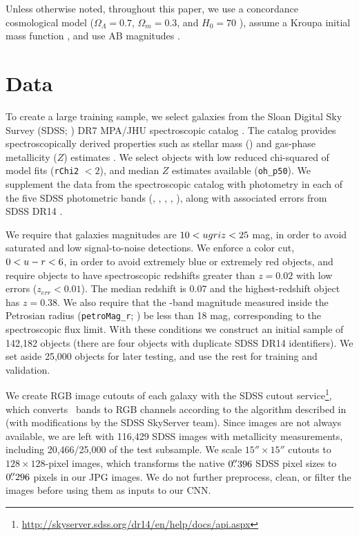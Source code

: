 \documentclass[fleqn,usenatbib]{mnras}
\begin{document}
Unless otherwise noted, throughout this paper, we use a concordance cosmological model ($\Omega_\Lambda = 0.7$, $\Omega_m = 0.3$, and $H_0= 70$ \kms{} \permpc), assume a Kroupa initial mass function \citep{Kroupa2001}, and use AB magnitudes \citep{Oke1974}.


\section{Data} \label{sec:data}
To create a large training sample, we select galaxies from the Sloan Digital Sky Survey (SDSS; \citealt{York2000}) DR7 MPA/JHU spectroscopic catalog \citep{Kauffmann2003a, Brinchmann2004, Tremonti2004, Salim2007}. The catalog provides spectroscopically derived properties such as stellar mass (\mstar) and gas-phase metallicity ($Z$) estimates \citep{Tremonti2004}. We select objects with low reduced chi-squared of model fits (\texttt{rChi2} $< 2$), and median $Z$ estimates available (\texttt{oh\_p50}). We supplement the data from the spectroscopic catalog with photometry in each of the five SDSS photometric bands (\sdssu, \sdssg, \sdssr, \sdssi, \sdssz), along with associated errors from SDSS DR14 \citep{Abolfathi2017}.

We require that galaxies magnitudes are $10 < \hbox{$u$} \hbox{$g$} \hbox{$r$} \hbox{$i$} \hbox{$z$} < 25$ mag, in order to avoid saturated and low signal-to-noise detections. We enforce a color cut, $0 < \hbox{$u$}-\hbox{$r$} < 6$, in order to avoid extremely blue or extremely red objects, and require objects to have spectroscopic redshifts greater than $z=0.02$ with low errors ($z_{err} < 0.01$). The median redshift is $0.07$ and the highest-redshift object has $z = 0.38$. We also require that the \sdssr-band magnitude measured inside the Petrosian radius (\texttt{petroMag\_r}; \citealt{Petrosian1976}) be less than 18 mag, corresponding to the spectroscopic flux limit. With these conditions we construct an initial sample of 142,182 objects (there are four objects with duplicate SDSS DR14 identifiers).
We set aside 25,000 objects for later testing, and use the rest for training and validation.

We create RGB image cutouts of each galaxy with the SDSS cutout service\footnote{\url{http://skyserver.sdss.org/dr14/en/help/docs/api.aspx}}, which converts \sdssg\sdssr\sdssi\ bands to RGB channels according to the algorithm described in \cite{Lupton2004} (with modifications by the SDSS SkyServer team). Since images are not always available, we are left with 116,429 SDSS images with metallicity measurements, including 20,466/25,000 of the test subsample. We scale $15''\times15''$ cutouts to $128\times128$-pixel images, which transforms the native $0\hbox{$.\!\!^{\prime\prime}$}396$ SDSS pixel sizes to $0\hbox{$.\!\!^{\prime\prime}$}296$ pixels in our JPG images. We do not further preprocess, clean, or filter the images before using them as inputs to our CNN.
\end{document}
